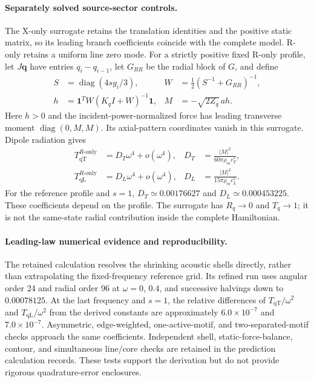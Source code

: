 \documentclass[10pt,aps,onecolumn,notitlepage,nofootinbib]{revtex4-2}
\newcommand{\qT}{\mathrm{qT}}
\newcommand{\qL}{\mathrm{qL}}
\begin{document}
\paragraph*{Separately solved source-sector controls.}
The X-only surrogate retains the translation identities and the positive static matrix, so its leading branch coefficients coincide with the complete model. R-only retains a uniform line zero mode. For a strictly positive fixed R-only profile, let $J\bm q$ have entries $q_i-q_{i-1}$, let $G_{RR}$ be the radial block of $G$, and define
\begin{align}
 S&=\operatorname{diag}(4s g_i/3),
 &W&=\tfrac12(S^{-1}+G_{RR})^{-1},\nonumber\\
 h&=\bm1^TW(K_qI+W)^{-1}\bm1,
 &M&=-\sqrt{2Z_q}\,a h.
\end{align}
Here $h>0$ and the incident-power-normalized force has leading transverse moment $\operatorname{diag}(0,M,M)$. Its axial-pattern coordinates vanish in this surrogate. Dipole radiation gives
\begin{align}
 T_{\qT}^{R\text{-only}}&=D_T\omega^4+o(\omega^4),
 &D_T&=\frac{|M|^2}{60\pi\rho_m c_T^5},\nonumber\\
 T_{\qL}^{R\text{-only}}&=D_L\omega^4+o(\omega^4),
 &D_L&=\frac{|M|^2}{15\pi\rho_m c_L^5}.
 \label{pred:sm-eq-radial-limit}
\end{align}
For the reference profile and $s=1$, $D_T\simeq0.00176627$ and $D_L\simeq0.000453225$. These coefficients depend on the profile. The surrogate has $R_q\to0$ and $T_q\to1$; it is not the same-state radial contribution inside the complete Hamiltonian.

\paragraph*{Leading-law numerical evidence and reproducibility.}
The retained calculation resolves the shrinking acoustic shells directly, rather than extrapolating the fixed-frequency reference grid. Its refined run uses angular order 24 and radial order 96 at $\omega=0$, $0.4$, and successive halvings down to $0.00078125$. At the last frequency and $s=1$, the relative differences of $T_{\qT}/\omega^2$ and $T_{\qL}/\omega^2$ from the derived constants are approximately $6.0\times10^{-7}$ and $7.0\times10^{-7}$. Asymmetric, edge-weighted, one-active-motif, and two-separated-motif checks approach the same coefficients. Independent shell, static-force-balance, contour, and simultaneous line/core checks are retained in the prediction calculation records. These tests support the derivation but do not provide rigorous quadrature-error enclosures.
\end{document}

